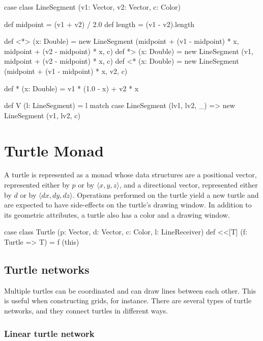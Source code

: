 \documentclass{article}
\begin{document}
      \begin{scalacode}
case class LineSegment (v1: Vector, v2: Vector, c: Color) {
  def midpoint = (v1 + v2) / 2.0
  def length   = (v1 - v2).length

  def <*> (x: Double) = new LineSegment (midpoint + (v1 - midpoint) * x, midpoint + (v2 - midpoint) * x, c)
  def  *> (x: Double) = new LineSegment (v1, midpoint + (v2 - midpoint) * x, c)
  def <*  (x: Double) = new LineSegment (midpoint + (v1 - midpoint) * x, v2, c)

  def * (x: Double) = v1 * (1.0 - x) + v2 * x

  def V (l: LineSegment) = l match {
    case LineSegment (lv1, lv2, _) => new LineSegment (v1, lv2, c)}
}
      \end{scalacode}

  \section{Turtle Monad}
    \label{sec:turtle-monad}

    A turtle is represented as a monad whose data structures are a positional vector, represented either by $p$ or by $\langle x, y, z \rangle$, and a
    directional vector, represented either by $d$ or by $\langle dx, dy, dz \rangle$. Operations performed on the turtle yield a new turtle and are expected to
    have side-effects on the turtle's drawing window. In addition to its geometric attributes, a turtle also has a color and a drawing window.

    \begin{scalacode}
case class Turtle (p: Vector, d: Vector, c: Color, l: LineReceiver) {
  def <<[T] (f: Turtle => T) = f (this)
}
    \end{scalacode}

    \subsection{Turtle networks}
      \label{sec:turtle-networks}

      Multiple turtles can be coordinated and can draw lines between each other. This is useful when constructing grids, for instance. There are several types
      of turtle networks, and they connect turtles in different ways.

      \subsubsection{Linear turtle network}
        \label{sec:linear-turtle-network}
\end{document}
